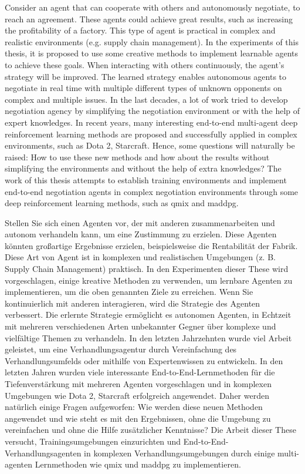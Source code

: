
Consider an agent that can cooperate with others and autonomously negotiate, to reach an agreement. These agents could achieve great results, such as increasing the profitability of a factory. This type of agent is practical in complex and realistic environments (e.g. supply chain management). In the experiments of this thesis, it is proposed to use some creative methods to implement learnable agents to achieve these goals. When interacting with others continuously, the agent’s strategy will be improved. The learned strategy enables autonomous agents to negotiate in real time with multiple different types of unknown opponents on complex and multiple issues. In the last decades, a lot of work tried to develop negotiation agency by simplifying the negotiation environment or with the help of expert knowledges. In recent years, many interesting end-to-end multi-agent deep reinforcement learning methods are proposed and successfully applied in complex environments, such as Dota 2, Starcraft. Hence, some questions will naturally be raised: How to use these new methods and how about the results without simplifying the environments and without the help of extra knowledges? The work of this thesis attempts to establish training environments and implement end-to-end negotiation agents in complex negotiation environments through some deep reinforcement learning methods, such as \gls{qmix} and \gls{maddpg}.


Stellen Sie sich einen Agenten vor, der mit anderen zusammenarbeiten und autonom verhandeln kann, um eine Zustimmung zu erzielen. Diese Agenten könnten großartige Ergebnisse erzielen, beispielsweise die Rentabilität der Fabrik. Diese Art von Agent ist in komplexen und realistischen Umgebungen (z. B. Supply Chain Management) praktisch. In den Experimenten dieser These wird vorgeschlagen, einige kreative Methoden zu verwenden, um lernbare Agenten zu implementieren, um die oben genannten Ziele zu erreichen. Wenn Sie kontinuierlich mit anderen interagieren, wird die Strategie des Agenten verbessert. Die erlernte Strategie ermöglicht es autonomen Agenten, in Echtzeit mit mehreren verschiedenen Arten unbekannter Gegner über komplexe und vielfältige Themen zu verhandeln. In den letzten Jahrzehnten wurde viel Arbeit geleistet, um eine Verhandlungsagentur durch Vereinfachung des Verhandlungsumfelds oder mithilfe von Expertenwissen zu entwickeln. In den letzten Jahren wurden viele interessante End-to-End-Lernmethoden für die Tiefenverstärkung mit mehreren Agenten vorgeschlagen und in komplexen Umgebungen wie Dota 2, Starcraft erfolgreich angewendet. Daher werden natürlich einige Fragen aufgeworfen: Wie werden diese neuen Methoden angewendet und wie steht es mit den Ergebnissen, ohne die Umgebung zu vereinfachen und ohne die Hilfe zusätzlicher Kenntnisse? Die Arbeit dieser These versucht, Trainingsumgebungen einzurichten und End-to-End-Verhandlungsagenten in komplexen Verhandlungsumgebungen durch einige multi-agenten Lernmethoden wie \gls{qmix} und \gls{maddpg} zu implementieren.
